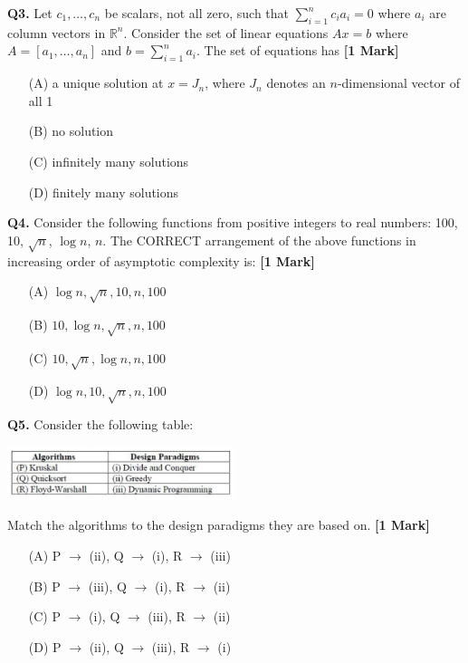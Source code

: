 \documentclass[11pt]{article}
\newcommand{\questiona}[2]{
    \noindent\textbf{Q#2.} #1 \hfill \textbf{[1 Mark]}
}
\begin{document}
\questiona{Let \( c_1, \ldots, c_n \) be scalars, not all zero, such that \( \sum_{i=1}^{n} c_i a_i = 0 \) where \( a_i \) are column vectors in \( \mathbb{R}^n \). Consider the set of linear equations \( Ax = b \) where \( A = [a_1, \ldots, a_n] \) and \( b = \sum_{i=1}^{n} a_i \). The set of equations has}{3}
\begin{enumerate}
    \item[(A)] a unique solution at \( x = J_n \), where \( J_n \) denotes an \( n \)-dimensional vector of all 1  
    \item[(B)] no solution  
    \item[(C)] infinitely many solutions  
    \item[(D)] finitely many solutions  
\end{enumerate}
\vspace{0.5cm}

\questiona{Consider the following functions from positive integers to real numbers:  
100, 10, \( \sqrt{n} \), \( \log n \), \( n \).  
The CORRECT arrangement of the above functions in increasing order of asymptotic complexity is:}{4}
\begin{enumerate}
    \item[(A)] \( \log n, \sqrt{n}, 10, n, 100 \)  
    \item[(B)] \( 10, \log n, \sqrt{n}, n, 100 \)  
    \item[(C)] \( 10, \sqrt{n}, \log n, n, 100 \)  
    \item[(D)] \( \log n, 10, \sqrt{n}, n, 100 \)  
\end{enumerate}
\vspace{0.5cm}

\questiona{Consider the following table:  
\begin{center}
\includegraphics[width=0.5\textwidth]{figures/5.png}
\end{center}
Match the algorithms to the design paradigms they are based on.}{5}
\begin{enumerate}
    \item[(A)] P \(\rightarrow\) (ii), Q \(\rightarrow\) (i), R \(\rightarrow\) (iii)  
    \item[(B)] P \(\rightarrow\) (iii), Q \(\rightarrow\) (i), R \(\rightarrow\) (ii)  
    \item[(C)] P \(\rightarrow\) (i), Q \(\rightarrow\) (iii), R \(\rightarrow\) (ii)  
    \item[(D)] P \(\rightarrow\) (ii), Q \(\rightarrow\) (iii), R \(\rightarrow\) (i)  
\end{enumerate}
\vspace{0.5cm}
\end{document}
